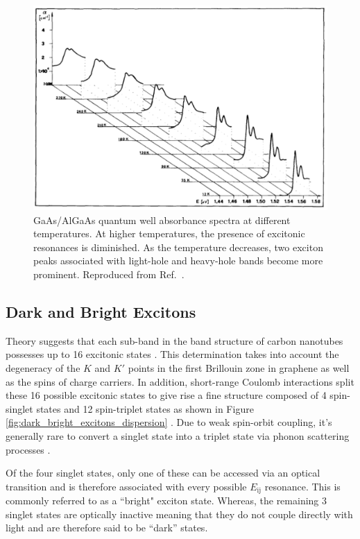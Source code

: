 \begin{figure}[h]
	\centering
	\includegraphics[scale=0.55]{images/chapter_optical_props/gaas_absorbance_filipowicz}
	\caption{GaAs/AlGaAs quantum well absorbance spectra at different temperatures. At higher temperatures, the presence of excitonic resonances is diminished. As the temperature decreases, two exciton peaks associated with light-hole and heavy-hole bands become more prominent. Reproduced from Ref.\ \cite{filipowicz1990temperature}.}
	\label{fig:gaas_vs_cnt_absorbance}
\end{figure}

\subsection{Dark and Bright Excitons}

Theory suggests that each sub-band in the band structure of carbon nanotubes possesses up to 16 excitonic states \cite{amori2018excitons}. This determination takes into account the degeneracy of the $K$ and $K'$ points in the first Brillouin zone in graphene as well as the spins of charge carriers. In addition, short-range Coulomb interactions split these 16 possible excitonic states to give rise a fine structure composed of 4 spin-singlet states and 12 spin-triplet states as shown in Figure \ref{fig:dark_bright_excitons_dispersion} \cite{srivastava2008direct}. Due to weak spin-orbit coupling, it's generally rare to convert a singlet state into a triplet state via phonon scattering processes \cite{amori2018excitons}.

Of the four singlet states, only one of these can be accessed via an optical transition and is therefore associated with every possible $E_\text{ij}$ resonance. This is commonly referred to as a ``bright" exciton state. Whereas, the remaining 3 singlet states are optically inactive meaning that they do not couple directly with light and are therefore said to be  ``dark'' states.

